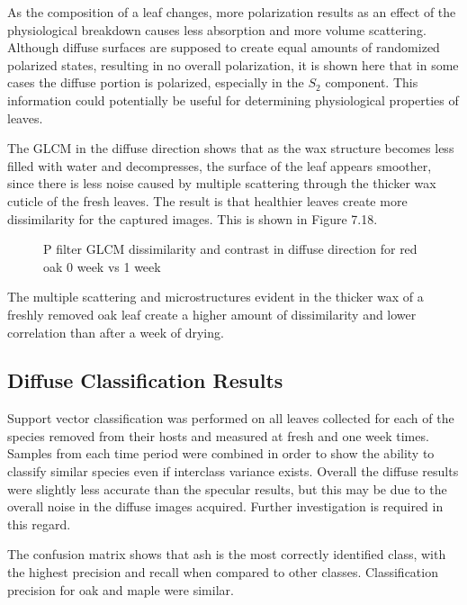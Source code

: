 As the composition of a leaf changes, more polarization results as an effect of the physiological breakdown causes less absorption and more volume scattering.  Although diffuse surfaces are supposed to create equal amounts of randomized polarized states, resulting in no overall polarization, it is shown here that in some cases the diffuse portion is polarized, especially in the $S_2$ component.  This information could potentially be useful for determining physiological properties of leaves.

The GLCM in the diffuse direction shows that as the wax structure becomes less filled with water and decompresses, the surface of the leaf appears smoother, since there is less noise caused by multiple scattering through the thicker wax cuticle of the fresh leaves.  The result is that healthier leaves create more dissimilarity for the captured images.  This is shown in Figure 7.18.
%
\begin{sidewaysfigure}
    \begin{center}
    \end{center}
    \caption{P filter GLCM dissimilarity and contrast in diffuse direction for red oak 0 week vs 1 week}
    \label{fig:polarization}
\end{sidewaysfigure}
%
The multiple scattering and microstructures evident in the thicker wax of a freshly removed oak leaf create a higher amount of dissimilarity and lower correlation than after a week of drying.

\subsection{Diffuse Classification Results}
Support vector classification was performed on all leaves collected for each of the species removed from their hosts and measured at fresh and one week times. Samples from each time period were combined in order to show the ability to classify similar species even if interclass variance exists.  Overall the diffuse results were slightly less accurate than the specular results, but this may be due to the overall noise in the diffuse images acquired.  Further investigation is required in this regard.

The confusion matrix shows that ash is the most correctly identified class, with the highest precision and recall when compared to other classes.  Classification precision for oak and maple were similar.

